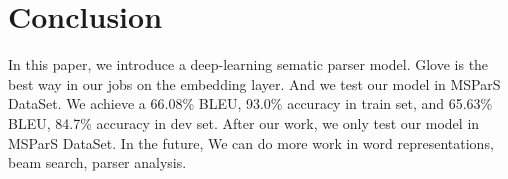 \section{Conclusion}
In this paper, we introduce a deep-learning sematic parser model. Glove is the best way in our jobs on the embedding layer. And we test our model in MSParS DataSet. We achieve a 66.08\% BLEU, 93.0\% accuracy in train set, and 65.63\% BLEU, 84.7\% accuracy in dev set. After our work, we only test our model in MSParS DataSet. In the future, We can do more work in word representations, beam search, parser analysis.